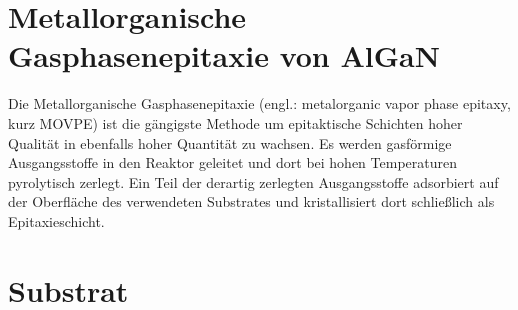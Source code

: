 \thispagestyle{fancy}


\section{Metallorganische Gasphasenepitaxie von AlGaN}

Die Metallorganische Gasphasenepitaxie (engl.: metalorganic vapor phase epitaxy, kurz MOVPE) ist die gängigste Methode um epitaktische Schichten hoher Qualität in ebenfalls hoher Quantität zu wachsen. Es werden gasförmige Ausgangsstoffe in den Reaktor geleitet und dort bei hohen Temperaturen pyrolytisch zerlegt. Ein Teil der derartig zerlegten Ausgangsstoffe adsorbiert auf der Oberfläche des verwendeten Substrates und kristallisiert dort schließlich als Epitaxieschicht. 

\section{Substrat}


